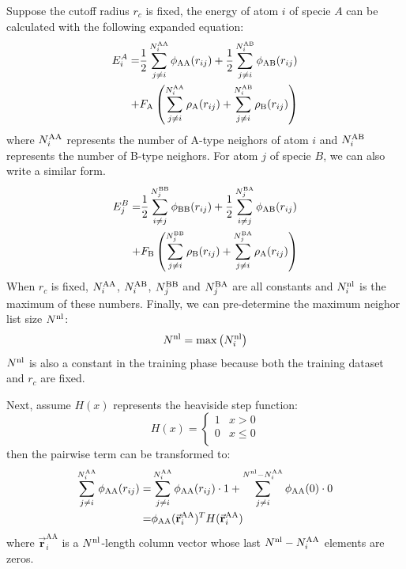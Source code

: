 \documentclass[prb,reprint]{revtex4-2}
\begin{document}
Suppose the cutoff radius $r_c$ is fixed, the energy of atom $i$ of specie $A$ 
can be calculated with the following expanded equation:
\begin{align}
\label{eq:e_atom_phase_1}
E_{i}^{A} 
= & 
\frac{1}{2}\sum_{j\neq i}^{N_{i}^{\mathrm{AA}}}\phi_{\mathrm{AA}}(r_{ij}) +
\frac{1}{2}\sum_{j\neq i}^{N_{i}^{\mathrm{AB}}}\phi_{\mathrm{AB}}(r_{ij}) \nonumber \\
+ & F_{\mathrm{A}}\left(
    \sum_{j\neq i}^{N_{i}^{\mathrm{AA}}}{\rho_{\mathrm{A}}(r_{ij})} +
    \sum_{j\neq i}^{N_{i}^{\mathrm{AB}}}{\rho_{\mathrm{B}}(r_{ij})} 
\right)
\end{align}
where $N_{i}^{\mathrm{AA}}$ represents the number of A-type neighors of atom $i$ and 
$N_{i}^{\mathrm{AB}}$ represents the number of B-type neighors. For atom $j$ of specie $B$, we
can also write a similar form. 
\begin{align}
\label{eq:e_atom_phase_1}
E_{j}^{B} 
= & 
\frac{1}{2}\sum_{i \neq j}^{N_{j}^{\mathrm{BB}}}\phi_{\mathrm{BB}}(r_{ij}) +
\frac{1}{2}\sum_{i \neq j}^{N_{j}^{\mathrm{BA}}}\phi_{\mathrm{AB}}(r_{ij}) \nonumber \\
+ & F_{\mathrm{B}}\left(
    \sum_{j\neq i}^{N_{j}^{\mathrm{BB}}}{\rho_{\mathrm{B}}(r_{ij})} +
    \sum_{j\neq i}^{N_{j}^{\mathrm{BA}}}{\rho_{\mathrm{A}}(r_{ij})} 
\right)
\end{align}
When $r_c$ is fixed, $N_{i}^{\mathrm{AA}}$, $N_{i}^{\mathrm{AB}}$, $N_{j}^{\mathrm{BB}}$ and $N_{j}^{\mathrm{BA}}$ are all constants and
$N^{\mathrm{nl}}_i$ is the maximum of these numbers. Finally, we can pre-determine the 
maximum neighor list size $N^{\mathrm{nl}}$:
\begin{equation}
\label{eq:nnl}
N^{\mathrm{nl}} = \max{\left(N^{\mathrm{nl}}_i\right)}
\end{equation}
$N^{\mathrm{nl}}$ is also a constant in the training phase because both the training 
dataset and $r_c$ are fixed.

Next, assume $H(x)$ represents the heaviside step function:
\begin{equation}
\label{eq:heaviside}
H(x) = \begin{cases}
    1 & x > 0 \\
    0 & x \leq 0 \\
\end{cases}
\end{equation}
then the pairwise term can be transformed to:
\begin{align}
\sum_{j\neq i}^{N_{i}^{\mathrm{AA}}}\phi_{\mathrm{AA}}(r_{ij}) = &
\sum_{j\neq i}^{N_{i}^{\mathrm{AA}}}\phi_{\mathrm{AA}}(r_{ij}) \cdot 1 + 
\sum_{j\neq i}^{N^{\mathrm{nl}} - N_{i}^{\mathrm{AA}}}\phi_{\mathrm{AA}}(0) \cdot 0 \nonumber \\
= & \phi_{\mathrm{AA}}(\vec{\mathbf{r}}_{i}^{\mathrm{AA}})^T
H(\vec{\mathbf{r}}_{i}^{\mathrm{AA}})
\end{align}
where $\vec{\mathbf{r}}_{i}^{\mathrm{AA}}$ is a $N^{\mathrm{nl}}$-length column vector 
whose last $N^{\mathrm{nl}} - N_{i}^{\mathrm{AA}}$ elements are zeros.
\end{document}
